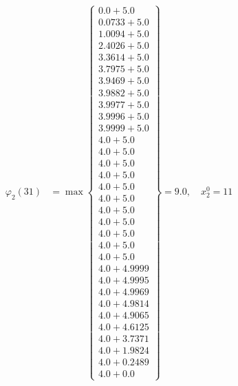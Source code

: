\documentclass{article}
\begin{document}
\begin{align*}
  
\varphi_{2}(31) &= \max \left\{ \begin{array}{c}
0.0 + 5.0 \\
 0.0733 + 5.0 \\
 1.0094 + 5.0 \\
 2.4026 + 5.0 \\
 3.3614 + 5.0 \\
 3.7975 + 5.0 \\
 3.9469 + 5.0 \\
 3.9882 + 5.0 \\
 3.9977 + 5.0 \\
 3.9996 + 5.0 \\
 3.9999 + 5.0 \\
 4.0 + 5.0 \\
 4.0 + 5.0 \\
 4.0 + 5.0 \\
 4.0 + 5.0 \\
 4.0 + 5.0 \\
 4.0 + 5.0 \\
 4.0 + 5.0 \\
 4.0 + 5.0 \\
 4.0 + 5.0 \\
 4.0 + 5.0 \\
 4.0 + 5.0 \\
 4.0 + 4.9999 \\
 4.0 + 4.9995 \\
 4.0 + 4.9969 \\
 4.0 + 4.9814 \\
 4.0 + 4.9065 \\
 4.0 + 4.6125 \\
 4.0 + 3.7371 \\
 4.0 + 1.9824 \\
 4.0 + 0.2489 \\
 4.0 + 0.0
\end{array} \right\}=9.0,\quad x_{2}^0=11\\
  
  
  

\end{align*}
\end{document}
